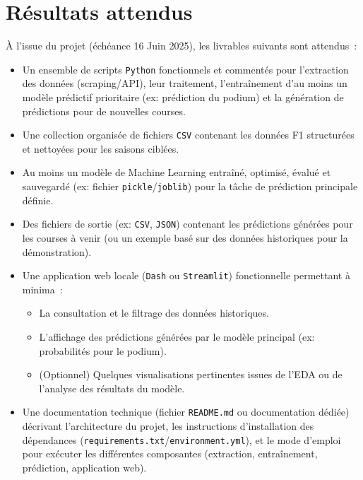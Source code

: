 \documentclass[11pt, a4paper]{article}
\newcommand{\lib}[1]{\texttt{#1}}
\newcommand{\endDate}{16 Juin 2025}
\begin{document}
\section{Résultats attendus}
À l'issue du projet (échéance \endDate), les livrables suivants sont attendus~:
\begin{itemize}[label=\textbullet, itemsep=0.2em, leftmargin=*]
    \item Un ensemble de scripts \lib{Python} fonctionnels et commentés pour l'extraction des données (scraping/API), leur traitement, l'entraînement d'au moins un modèle prédictif prioritaire (ex: prédiction du podium) et la génération de prédictions pour de nouvelles courses.
    \item Une collection organisée de fichiers \lib{CSV} contenant les données F1 structurées et nettoyées pour les saisons ciblées.
    \item Au moins un modèle de Machine Learning entraîné, optimisé, évalué et sauvegardé (ex: fichier \lib{pickle}/\lib{joblib}) pour la tâche de prédiction principale définie.
    \item Des fichiers de sortie (ex: \lib{CSV}, \lib{JSON}) contenant les prédictions générées pour les courses à venir (ou un exemple basé sur des données historiques pour la démonstration). %
    \item Une application web locale (\lib{Dash} ou \lib{Streamlit}) fonctionnelle permettant à minima~:
    \begin{itemize}[label=\textendash, itemsep=0.2em, leftmargin=*]
        \item La consultation et le filtrage des données historiques. %
        \item L'affichage des prédictions générées par le modèle principal (ex: probabilités pour le podium). %
        \item (Optionnel) Quelques visualisations pertinentes issues de l'EDA ou de l'analyse des résultats du modèle.
    \end{itemize}
    \item Une documentation technique (fichier \texttt{README.md} ou documentation dédiée) décrivant l'architecture du projet, les instructions d'installation des dépendances (\lib{requirements.txt}/\lib{environment.yml}), et le mode d'emploi pour exécuter les différentes composantes (extraction, entraînement, prédiction, application web). %
\end{itemize}
\end{document}
